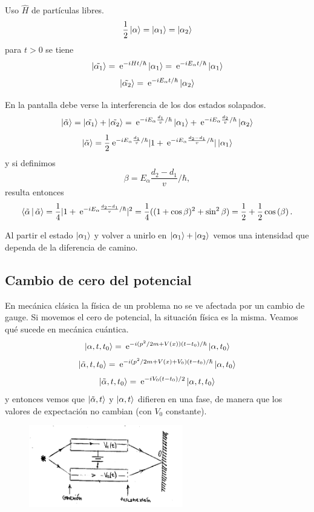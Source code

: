 \documentclass[10pt,oneside]{CBFT_book}
\begin{document}
Uso $\hat{H}$ de partículas libres.
\[
	\frac{1}{2} \Ket{\alpha} = \Ket{\alpha_1} = \Ket{\alpha_2}
\]
para $t>0$ se tiene 
\[
	\Ket{\tilde{\alpha_1}} = \:\mathrm{e}^{ -i H t /\hbar } \Ket{\alpha_1} =
		\:\mathrm{e}^{ -i E_\alpha t /\hbar } \Ket{\alpha_1}	
\]
\[
	\Ket{\tilde{\alpha_2}} = \:\mathrm{e}^{ -i E_\alpha t /\hbar } \Ket{\alpha_2}	
\]

En la pantalla debe verse la interferencia de los dos estados solapados.
\[
	\Ket{\tilde{\alpha}} = \Ket{\tilde{\alpha_1}} + \Ket{\tilde{\alpha_2}} =
		\:\mathrm{e}^{ -i E_\alpha \frac{d_1}{v} /\hbar } \Ket{\alpha_1} +
		\:\mathrm{e}^{ -i E_\alpha \frac{d_2}{v} /\hbar } \Ket{\alpha_2}	
\]
\[
	\Ket{\tilde{\alpha}} = \frac{1}{2} \:\mathrm{e}^{ -i E_\alpha \frac{d_1}{v} /\hbar } 
		| 1 + \:\mathrm{e}^{ -i E_\alpha \frac{d_2-d_1}{v} /\hbar } | \Ket{\alpha_1}
\]
y si definimos
\[
	\beta=E_\alpha \frac{d_2-d_1}{v} /\hbar,
\]
resulta entonces
\[
	\Braket{\tilde{\alpha}|\tilde{\alpha}} = \frac{1}{4}| 1 +  \:\mathrm{e}^{ -i E_\alpha \frac{d_2-d_1}{v} /\hbar } |^2 =
		\frac{1}{4}( (1+\cos\beta)^2 + \sin^2\beta ) =
			\frac{1}{2} + \frac{1}{2}\cos\left( \beta \right).
\]


Al partir el estado $\Ket{\alpha_1} $ y volver a unirlo en $\Ket{\alpha_1} + \Ket{\alpha_2}$ vemos una intensidad que 
dependa de la diferencia de camino.

\subsection{Cambio de cero del potencial}

En mecánica clásica la física de un problema no se ve afectada por un cambio de gauge.
Si movemos el cero de potencial, la situación física es la misma.
Veamos qué sucede en mecánica cuántica.
\[
	\Ket{\alpha,t,t_0} = \:\mathrm{e}^{ -i (p^2/2m + V(x))(t-t_0)/\hbar} \Ket{\alpha,t_0}
\]
\[
	\Ket{\tilde{\alpha},t,t_0} = \:\mathrm{e}^{ -i (p^2/2m + V(x) + V_0)(t-t_0)/\hbar} \Ket{\alpha,t_0}
\]
\[
	\Ket{\tilde{\alpha},t,t_0} = \:\mathrm{e}^{ -i V_0(t-t_0)/2 }\Ket{\alpha,t,t_0}
\]
y entonces vemos que $\Ket{\tilde{\alpha},t}$ y $\Ket{\alpha,t}$ difieren en una fase, de manera que los valores de 
expectación no cambian (con $V_0$ constante).

\begin{figure}[htb]
	\begin{center}
	\includegraphics[width=0.6\textwidth]{images/teo2_7.pdf}	 
	\end{center}
	\caption{}
\end{figure} 
\end{document}
